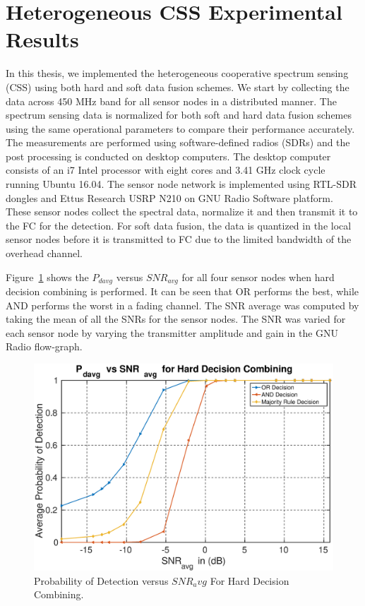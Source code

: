 \section{Heterogeneous CSS Experimental Results}
In this thesis, we implemented the heterogeneous cooperative spectrum sensing (CSS) using both hard and soft data fusion schemes. We start by collecting the data across 450 MHz band for all sensor nodes in a distributed manner. The spectrum sensing data is normalized for both soft and hard data fusion schemes using the same operational parameters to compare their performance accurately. The measurements are performed using software-defined radios (SDRs) and the post processing is conducted on desktop computers. The desktop computer consists of an i7 Intel processor with eight cores and 3.41 GHz clock cycle running Ubuntu 16.04. The sensor node network is implemented using RTL-SDR dongles and Ettus Research USRP N210 on GNU Radio Software platform.
These sensor nodes collect the spectral data, normalize it and then transmit it to the FC for the detection. For soft data fusion, the data is quantized in the local sensor nodes before it is transmitted to FC due to the limited bandwidth of the overhead channel. 

Figure~\ref{hardres} shows the $P_{davg}$ versus $SNR_{avg}$ for all four sensor nodes when hard decision combining is performed. It can be seen that OR performs the best, while AND performs the worst in a fading channel. The SNR average was computed by taking the mean of all the SNRs for the sensor nodes. The SNR was varied for each sensor node by varying the transmitter amplitude and gain in the GNU Radio flow-graph.

\begin{figure}[ht!]
	\centering
	\includegraphics[width=\textwidth,keepaspectratio]{images/Gill/figs/hardecisionpd.eps}
    \caption{Probability of Detection versus $SNR_avg$ For Hard Decision Combining.} 
\label{hardres}      
\end{figure}

